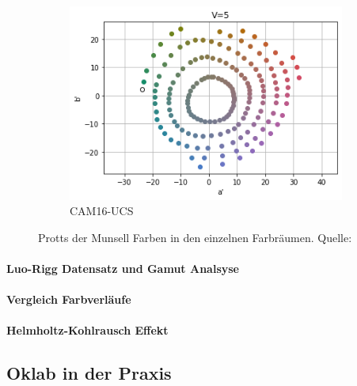 \documentclass[12pt, a4paper, ngerman]{article}
\begin{document}
\begin{figure}
\begin{subfigure}[b]{0.3\linewidth}
    \includegraphics[width=\linewidth]{Grafiken/Vergleich_Munsell/cam16_munsell.png}
    \caption{CAM16-UCS}
    \label{fig:munsell_cam}
  \end{subfigure}
  
  \caption{Protts der Munsell Farben in den einzelnen Farbräumen. Quelle: ~\cite{Oklab_2020}}
  \label{fig:munsell_plots}
\end{figure}

\paragraph{Luo-Rigg Datensatz und Gamut Analsyse}
\paragraph{Vergleich Farbverläufe}

\paragraph{Helmholtz-Kohlrausch Effekt}

\subsection{Oklab in der Praxis}

\newpage
\printbibliography
\end{document}
